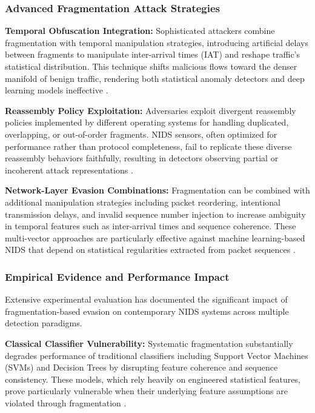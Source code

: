 \subsubsection{Advanced Fragmentation Attack Strategies}

\textbf{Temporal Obfuscation Integration:}
Sophisticated attackers combine fragmentation with temporal manipulation strategies, introducing artificial delays between fragments to manipulate inter-arrival times (IAT) and reshape traffic's statistical distribution. This technique shifts malicious flows toward the denser manifold of benign traffic, rendering both statistical anomaly detectors and deep learning models ineffective \cite{liu2025hard, he2023adversarial}.

\textbf{Reassembly Policy Exploitation:}
Adversaries exploit divergent reassembly policies implemented by different operating systems for handling duplicated, overlapping, or out-of-order fragments. NIDS sensors, often optimized for performance rather than protocol completeness, fail to replicate these diverse reassembly behaviors faithfully, resulting in detectors observing partial or incoherent attack representations \cite{md2025guardians, bittau2005fragmentation}.

\textbf{Network-Layer Evasion Combinations:}
Fragmentation can be combined with additional manipulation strategies including packet reordering, intentional transmission delays, and invalid sequence number injection to increase ambiguity in temporal features such as inter-arrival times and sequence coherence. These multi-vector approaches are particularly effective against machine learning-based NIDS that depend on statistical regularities extracted from packet sequences \cite{han2021evaluating, ennaji2025adversarial}.

\subsubsection{Empirical Evidence and Performance Impact}

Extensive experimental evaluation has documented the significant impact of fragmentation-based evasion on contemporary NIDS systems across multiple detection paradigms.

\textbf{Classical Classifier Vulnerability:}
Systematic fragmentation substantially degrades performance of traditional classifiers including Support Vector Machines (SVMs) and Decision Trees by disrupting feature coherence and sequence consistency. These models, which rely heavily on engineered statistical features, prove particularly vulnerable when their underlying feature assumptions are violated through fragmentation \cite{sarikaya2023raids}.

